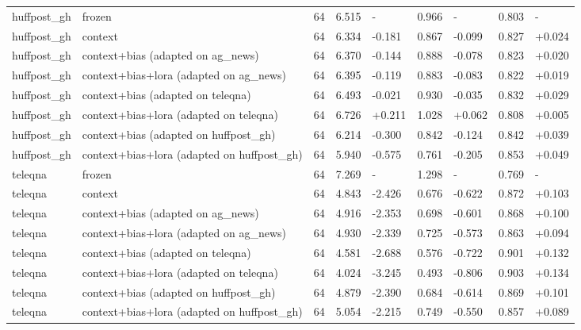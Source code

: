 \begin{tabular}{lllllllll}
huffpost\_gh & frozen & 64 & 6.515 & - & 0.966 & - & 0.803 & - \\
huffpost\_gh & context & 64 & 6.334 & -0.181 & 0.867 & -0.099 & 0.827 & +0.024 \\
huffpost\_gh & context+bias (adapted on ag\_news) & 64 & 6.370 & -0.144 & 0.888 & -0.078 & 0.823 & +0.020 \\
huffpost\_gh & context+bias+lora (adapted on ag\_news) & 64 & 6.395 & -0.119 & 0.883 & -0.083 & 0.822 & +0.019 \\
huffpost\_gh & context+bias (adapted on teleqna) & 64 & 6.493 & -0.021 & 0.930 & -0.035 & 0.832 & +0.029 \\
huffpost\_gh & context+bias+lora (adapted on teleqna) & 64 & 6.726 & +0.211 & 1.028 & +0.062 & 0.808 & +0.005 \\
huffpost\_gh & context+bias (adapted on huffpost\_gh) & 64 & 6.214 & -0.300 & 0.842 & -0.124 & 0.842 & +0.039 \\
huffpost\_gh & context+bias+lora (adapted on huffpost\_gh) & 64 & 5.940 & -0.575 & 0.761 & -0.205 & 0.853 & +0.049 \\
teleqna & frozen & 64 & 7.269 & - & 1.298 & - & 0.769 & - \\
teleqna & context & 64 & 4.843 & -2.426 & 0.676 & -0.622 & 0.872 & +0.103 \\
teleqna & context+bias (adapted on ag\_news) & 64 & 4.916 & -2.353 & 0.698 & -0.601 & 0.868 & +0.100 \\
teleqna & context+bias+lora (adapted on ag\_news) & 64 & 4.930 & -2.339 & 0.725 & -0.573 & 0.863 & +0.094 \\
teleqna & context+bias (adapted on teleqna) & 64 & 4.581 & -2.688 & 0.576 & -0.722 & 0.901 & +0.132 \\
teleqna & context+bias+lora (adapted on teleqna) & 64 & 4.024 & -3.245 & 0.493 & -0.806 & 0.903 & +0.134 \\
teleqna & context+bias (adapted on huffpost\_gh) & 64 & 4.879 & -2.390 & 0.684 & -0.614 & 0.869 & +0.101 \\
teleqna & context+bias+lora (adapted on huffpost\_gh) & 64 & 5.054 & -2.215 & 0.749 & -0.550 & 0.857 & +0.089 \\
\hline
\end{tabular}
